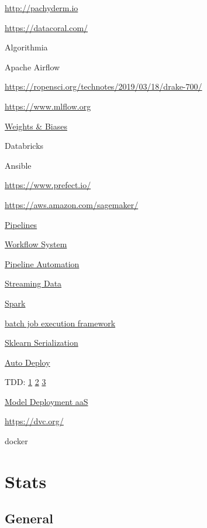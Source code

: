 \documentclass[]{book}
\begin{document}
\url{http://pachyderm.io}

\url{https://datacoral.com/}

Algorithmia

Apache Airflow

\url{https://ropensci.org/technotes/2019/03/18/drake-700/}

\url{https://www.mlflow.org}

\href{https://www.wandb.com/blog/towards-reproducibility}{Weights \&
Biases}

Databricks

Ansible

\url{https://www.prefect.io/}

\url{https://aws.amazon.com/sagemaker/}

\href{http://stat545.com/automation01_slides/\#/automating-data-analysis-pipelines}{Pipelines}

\href{https://snakemake.readthedocs.io/en/stable/}{Workflow System}

\href{http://stat545.com/automation01_slides/\#/automating-data-analysis-pipelines}{Pipeline
Automation}

\href{https://www.wallaroolabs.com}{Streaming Data}

\href{https://docs.azuredatabricks.net/spark/latest/mllib/mllib-pipelines-and-stuctured-streaming.html}{Spark}

\href{https://stitchfix.github.io/flotilla-os/}{batch job execution
framework}

\href{https://cmry.github.io/notes/serialize}{Sklearn Serialization}

\href{http://content.nexosis.com/twimlai}{Auto Deploy}

TDD:
\href{http://engineering.pivotal.io/post/test-driven-development-for-data-science/}{1}
\textbar{} \href{http://www.tdda.info/}{2} \textbar{}
\href{http://stochasticsolutions.com/}{3}

\href{https://orchestrahq.com}{Model Deployment aaS}

\url{https://dvc.org/}

docker

\chapter{Stats}\label{stats}

\section{General}\label{general-6}
\end{document}
